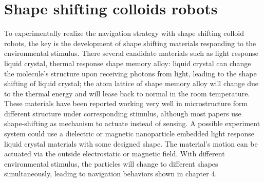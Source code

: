\section{Shape shifting colloids robots}
To experimentally realize the navigation strategy with shape shifting colloid robots, the key is the development of shape shifting materials responding to the environmental stimulus. There several candidate materials such as  light response liquid crystal\cite{palagi2016structured}, thermal response shape memory alloy\cite{busch1991shape}: liquid crystal can change the molecule's structure upon receiving photons from  light, leading to the shape shifting of liquid crystal; the atom lattice of shape memory alloy will change due to the thermal energy and will lease back to normal in the room temperature. These materials have been reported working very well in microstructure form different structure under corresponding stimulus\cite{breger2015self}, although most papers use shape-shifting as mechanism to actuate instead of sensing.\cite{tu2017self,li2018light} A possible experiment system could use a dielectric or magnetic nanoparticle embedded light response liquid crystal materials with some designed shape.   The material's motion can be actuated via the outside electrostatic or magnetic field. With different environmental stimulus, the particles will change to different shapes simultaneously, leading to navigation behaviors shown in chapter 4. 

